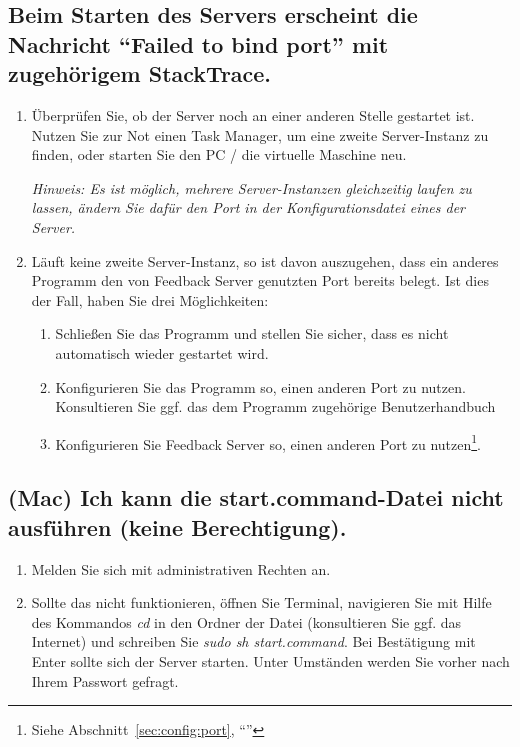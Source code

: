 \subsection[``Failed to bind port'']{Beim Starten des Servers erscheint die Nachricht ``Failed to bind port'' mit zugehörigem StackTrace.}
\begin{enumerate}
    \item Überprüfen Sie, ob der Server noch an einer anderen Stelle gestartet ist. Nutzen Sie zur Not
    einen Task Manager, um eine zweite Server-Instanz zu finden, oder starten Sie den PC / die
    virtuelle Maschine neu.

    \emph{Hinweis: Es ist möglich, mehrere Server-Instanzen gleichzeitig laufen zu lassen, ändern Sie
    dafür den Port in der Konfigurationsdatei eines der Server.}
    \item Läuft keine zweite Server-Instanz, so ist davon auszugehen, dass ein anderes Programm den
    von Feedback Server genutzten Port bereits belegt. Ist dies der Fall, haben Sie drei
    Möglichkeiten:
    \begin{enumerate}
        \item Schließen Sie das Programm und stellen Sie sicher, dass es nicht automatisch wieder gestartet wird.
        \item Konfigurieren Sie das Programm so, einen anderen Port zu nutzen. Konsultieren Sie ggf. das dem Programm zugehörige Benutzerhandbuch
        \item Konfigurieren Sie Feedback Server so, einen anderen Port zu nutzen\footnote{Siehe Abschnitt~\ref{sec:config:port}, ``''}.
    \end{enumerate}
\end{enumerate}

\subsection[Mac: Fehler beim Ausf"uhren von start.command]{(Mac) Ich kann die start.command-Datei nicht ausführen (keine Berechtigung).}
\begin{enumerate}
    \item Melden Sie sich mit administrativen Rechten an.
    \item Sollte das nicht funktionieren, öffnen Sie Terminal, navigieren Sie mit Hilfe des Kommandos
    \emph{cd} in den Ordner der Datei (konsultieren Sie ggf. das Internet) und schreiben Sie \emph{sudo sh
    start.command}. Bei Bestätigung mit Enter sollte sich der Server starten. Unter Umständen werden Sie
    vorher nach Ihrem Passwort gefragt.
\end{enumerate}


